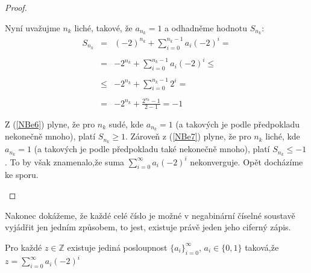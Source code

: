 \documentclass[czech,bachelor,dept470,male]{diploma}
\begin{document}
\begin{proof}
\begin{itemize}
		      Nyní uvažujme $n_k$ liché, takové, že $a_{n_k} = 1$ a odhadněme hodnotu $S_{n_k}$:
		      \begin{equation}\label{NBe7}
			      \begin{array}{rcl}
				      S_{n_k} & =    & (-2)^{n_k} + \sum_{i=0}^{n_k-1}a_i(-2)^i =               \\
				              &      &                                                          \\
				              & =    & - 2^{n_k} + \sum_{i=0}^{n_k-1}a_i(-2)^i \leq             \\
				              &      &                                                          \\
				              & \leq & - 2^{n_k} + \sum_{i=0}^{n_k-1}2^i =                      \\
				              &      &                                                          \\
				              & =    & \displaystyle{ - 2^{n_k} + \frac{2^{n_k} - 1}{2-1} = -1} \\
				              &      &                                                          \\
			      \end{array}
		      \end{equation}
		      Z (\ref{NBe6}) plyne, že pro $n_k$ sudé, kde $a_{n_k} = 1$ (a takových je podle předpokladu nekonečně mnoho), platí $S_{n_k} \geq 1$. Zároveň z (\ref{NBe7}) plyne, že pro $n_k$ liché, kde $a_{n_k} = 1$ (a takových je podle předpokladu také nekonečně mnoho), platí $S_{n_k} \leq -1$. To by však znamenalo,\newline že suma $\sum_{i=0}^{\infty}a_i(-2)^i$ nekonverguje. Opět docházíme ke sporu.
	\end{itemize}
\end{proof}
Nakonec dokážeme, že každé celé číslo je možné v negabinární číselné soustavě vyjádřit jen jedním způsobem, to jest, existuje právě jeden jeho ciferný zápis.
\begin{theorem}\label{NBv3}
	Pro každé $z\in\mathbb{Z}$ existuje jediná posloupnost $\{a_i\}_{i=0}^\infty$, $a_i \in\{0,1\}$ taková,\newline že $z = \sum_{i=0}^{\infty}a_i(-2)^i$
\end{theorem}
\end{document}
